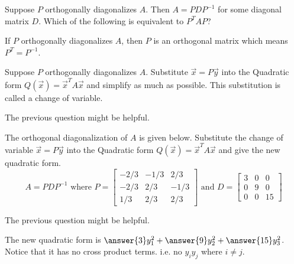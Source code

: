 \documentclass{ximera}
\begin{document}
  	\begin{question} 
  Suppose $P$ orthogonally diagonalizes $A$. Then $A=PDP^{-1}$ for some diagonal matrix $D$. Which of the following is equivalent to $P^TAP$?
  		\begin{multipleChoice}
  		\end{multipleChoice}
  	  		\vspace{10pt}
  	\begin{hint} If $P$ orthogonally diagonalizes $A$, then $P$ is an orthogonal matrix which means $P^T=P^{-1}$.\end{hint}
  	\end{question}
  	\begin{question} 
  	Suppose $P$ orthogonally diagonalizes $A$.    Substitute $\vec{x} = P\vec{y}$ into the Quadratic form $Q(\vec{x}) = \vec{x}^TA\vec{x}$ and simplify as much as possible. This substitution is called a change of variable.
  		\begin{multipleChoice}
  			\choice{$P\vec{y}^TAP\vec{y}$}
  			\choice[correct]{$\vec{y}^TD\vec{y}$}
  			\choice{$P^T\vec{y}^TAP\vec{y}$}
  			\choice{$A\vec{y}$}
  				\choice{$D\vec{y}$}
  		\end{multipleChoice}
  		\vspace{10pt}
  		\begin{hint}
  			The previous question might be helpful.
  			\end{hint}
  		
  	\end{question}
  		 	\begin{question} 
 	  		 	 The orthogonal diagonalization of $A$ is given below.    Substitute the change of variable $\vec{x} = P\vec{y}$ into the Quadratic form $Q(\vec{x}) = \vec{x}^TA\vec{x}$ and give the new quadratic form. 
  	  		$$A = PDP^{-1} \text{  where  } P = \begin{bmatrix}  -2/3 &-1/3&2/3\\ -2/3&2/3&-1/3\\ 1/3& 2/3& 2/3\end{bmatrix} \text{  and  } D= \begin{bmatrix} 3&0&0\\0&9&0\\0&0&15\end{bmatrix}$$
  	  		 	\vspace{10pt}
  	  		 	\begin{hint}
  	  		 		The previous question might be helpful.
  	  		 	\end{hint}
  	  		 		\vspace{10pt}
  	  		 		
  	  		 	The new quadratic form is $ \answer{3}y_1^2    +\answer{9}y_2^2+\answer{15}y_3^2           $. Notice that it has no cross product terms. i.e. no $y_iy_j$ where $i\neq j$.
		 \end{question} 		                       %
  		                       
  	  		                       
  	  		                       
  	  		                       
  	  		                       
  	  		                       

  
\end{document}
